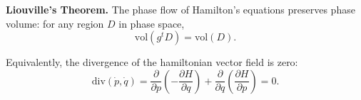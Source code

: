 \textbf{Liouville's Theorem.} The phase flow of Hamilton's equations preserves phase volume: for any region $D$ in phase space,
$$\text{vol}(g^t D) = \text{vol}(D).$$

Equivalently, the divergence of the hamiltonian vector field is zero:
$$\text{div}(\dot{p}, \dot{q}) = \frac{\partial}{\partial p}(-\frac{\partial H}{\partial q}) + \frac{\partial}{\partial q}(\frac{\partial H}{\partial p}) = 0.$$
